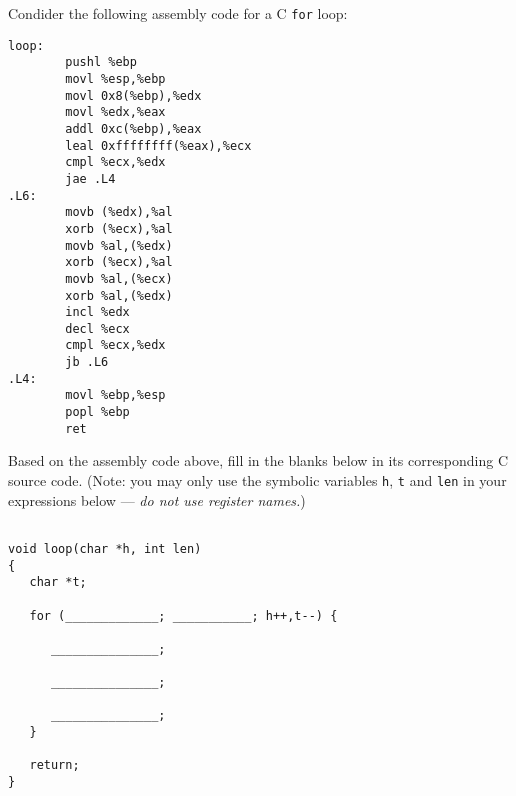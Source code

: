 \begin{problem}{10}
Condider the following assembly code for a C {\tt for} loop:

\begin{verbatim}
loop:
        pushl %ebp
        movl %esp,%ebp
        movl 0x8(%ebp),%edx
        movl %edx,%eax
        addl 0xc(%ebp),%eax
        leal 0xffffffff(%eax),%ecx
        cmpl %ecx,%edx
        jae .L4
.L6:
        movb (%edx),%al
        xorb (%ecx),%al
        movb %al,(%edx)
        xorb (%ecx),%al
        movb %al,(%ecx)
        xorb %al,(%edx)
        incl %edx
        decl %ecx
        cmpl %ecx,%edx
        jb .L6
.L4:
        movl %ebp,%esp
        popl %ebp
        ret
\end{verbatim}

Based on the assembly code above, fill in the blanks below in its
corresponding C source code.  (Note: you may only use the symbolic
variables {\tt h}, {\tt t} and {\tt len} in your expressions below
--- {\em do not use register names.})

\begin{verbatim}

void loop(char *h, int len)
{
   char *t;

   for (_____________; ___________; h++,t--) {

      _______________;

      _______________;

      _______________;
   }

   return;
}

\end{verbatim}


\end{problem}

